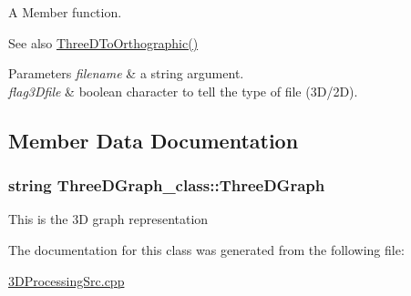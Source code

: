 A Member function. 

\begin{DoxySeeAlso}{See also}
\hyperlink{classThreeDGraph__class_ae69c2ee22498d903d1afa6b988edd1b6}{Three\+D\+To\+Orthographic()} 
\end{DoxySeeAlso}

\begin{DoxyParams}{Parameters}
{\em filename} & a string argument. \\
\hline
{\em flag3\+Dfile} & boolean character to tell the type of file (3\+D/2D). \\
\hline
\end{DoxyParams}


\subsection{Member Data Documentation}
\subsubsection[{\texorpdfstring{Three\+D\+Graph}{ThreeDGraph}}]{\setlength{\rightskip}{0pt plus 5cm}string Three\+D\+Graph\+\_\+class\+::\+Three\+D\+Graph\hspace{0.3cm}{\ttfamily [static]}}\hypertarget{classThreeDGraph__class_a3d1e11ebf54f535d143c864a448136e7}{}\label{classThreeDGraph__class_a3d1e11ebf54f535d143c864a448136e7}
This is the 3D graph representation 

The documentation for this class was generated from the following file\+:\begin{DoxyCompactItemize}
\item 
\hyperlink{3DProcessingSrc_8cpp}{3\+D\+Processing\+Src.\+cpp}\end{DoxyCompactItemize}

